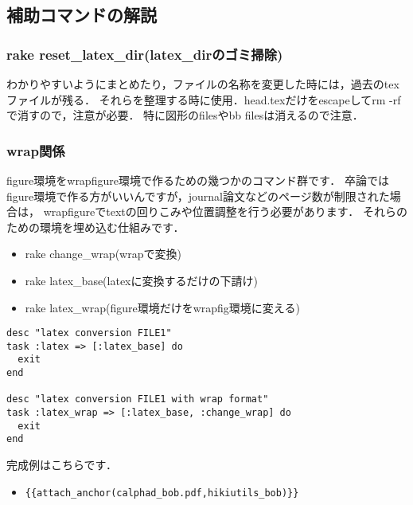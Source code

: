 \subsection{補助コマンドの解説}
\subsubsection{rake reset\_latex\_dir(latex\_dirのゴミ掃除)}
わかりやすいようにまとめたり，ファイルの名称を変更した時には，過去のtexファイルが残る．
それらを整理する時に使用．head.texだけをescapeしてrm -rfで消すので，注意が必要．
特に図形のfilesやbb filesは消えるので注意．

\subsubsection{wrap関係}
figure環境をwrapfigure環境で作るための幾つかのコマンド群です．
卒論ではfigure環境で作る方がいいんですが，journal論文などのページ数が制限された場合は，
wrapfigureでtextの回りこみや位置調整を行う必要があります．
それらのための環境を埋め込む仕組みです．

\begin{itemize}
\item rake change\_wrap(wrapで変換)
\item rake latex\_base(latexに変換するだけの下請け)
\item rake latex\_wrap(figure環境だけをwrapfig環境に変える)
\end{itemize}\begin{lstlisting}[style=customRuby]
desc "latex conversion FILE1"
task :latex => [:latex_base] do
  exit
end

desc "latex conversion FILE1 with wrap format"
task :latex_wrap => [:latex_base, :change_wrap] do
  exit
end
\end{lstlisting}
完成例はこちらです．

\begin{itemize}
\item \verb|{{attach_anchor(calphad_bob.pdf,hikiutils_bob)}}|
\end{itemize}
